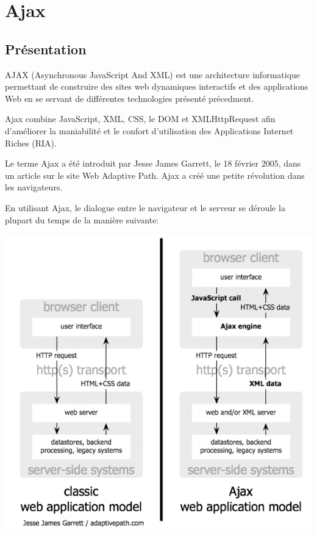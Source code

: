 \section{Ajax}
\label{ch:ajax}

\subsection{Présentation}

AJAX (Asynchronous JavaScript And XML) est une architecture informatique permettant de construire des sites web dynamiques interactifs et des applications Web en se servant de différentes technologies présenté précedment.

Ajax combine JavaScript, XML, CSS, le DOM et XMLHttpRequest afin d’améliorer la maniabilité et le confort d’utilisation des Applications Internet Riches (RIA).

Le terme Ajax a été introduit par Jesse James Garrett, le 18 février 2005, dans un article sur le site Web Adaptive Path. Ajax a créé une petite révolution dans les navigateurs.

En utilisant Ajax, le dialogue entre le navigateur et le serveur se déroule la plupart du temps de la manière suivante:

\begin{center}
\includegraphics[scale=0.6]{img/ajax.png}
\label{Graphique technologie ajax}
\end{center}
 


